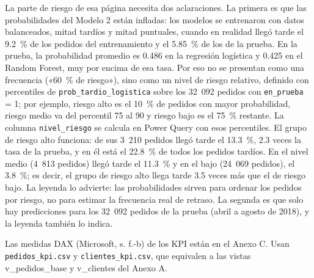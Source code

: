 \documentclass[a4paper,stu,12pt,donotrepeattitle,floatsintext]{apa7}
\begin{document}
La parte de riesgo de esa página necesita dos aclaraciones. La primera es que las probabilidades del Modelo 2 están infladas: los modelos se entrenaron con datos balanceados, mitad tardíos y mitad puntuales, cuando en realidad llegó tarde el 9.2~\% de los pedidos del entrenamiento y el 5.85~\% de los de la prueba. En la prueba, la probabilidad promedio es 0.486 en la regresión logística y 0.425 en el Random Forest, muy por encima de esa tasa. Por eso no se presentan como una frecuencia («60~\% de riesgo»), sino como un nivel de riesgo relativo, definido con percentiles de \texttt{prob\_\allowbreak{}tardio\_\allowbreak{}logistica} sobre los 32~092 pedidos con \texttt{en\_\allowbreak{}prueba} = 1; por ejemplo, riesgo alto es el 10~\% de pedidos con mayor probabilidad, riesgo medio va del percentil 75 al 90 y riesgo bajo es el 75~\% restante. La columna \texttt{nivel\_\allowbreak{}riesgo} se calcula en Power Query con esos percentiles. El grupo de riesgo alto funciona: de sus 3~210 pedidos llegó tarde el 13.3~\%, 2.3 veces la tasa de la prueba, y en él está el 22.8~\% de todos los pedidos tardíos. En el nivel medio (4~813 pedidos) llegó tarde el 11.3~\% y en el bajo (24~069 pedidos), el 3.8~\%; es decir, el grupo de riesgo alto llega tarde 3.5 veces más que el de riesgo bajo. La leyenda lo advierte: las probabilidades sirven para ordenar los pedidos por riesgo, no para estimar la frecuencia real de retraso. La segunda es que solo hay predicciones para los 32~092 pedidos de la prueba (abril a agosto de 2018), y la leyenda también lo indica.

Las medidas DAX (Microsoft, s. f.-b) de los KPI están en el Anexo C. Usan \texttt{pedidos\_\allowbreak{}kpi.csv} y \texttt{clientes\_\allowbreak{}kpi.csv}, que equivalen a las vistas v\_\allowbreak{}pedidos\_\allowbreak{}base y v\_\allowbreak{}clientes del Anexo A.

\end{document}
